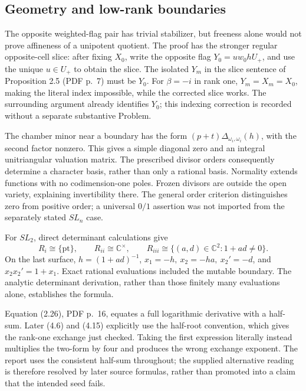 \documentclass[10pt]{article}
\begin{document}
\subsection*{Geometry and low-rank boundaries}
The opposite weighted-flag pair has trivial stabilizer, but freeness alone would not prove affineness of a unipotent quotient. The proof has the stronger regular opposite-cell slice: after fixing \(X_0\), write the opposite flag \(Y_0=u w_0hU_+\), and use the unique \(u\in U_+\) to obtain the slice. The isolated \(Y_m\) in the slice sentence of Proposition 2.5 (PDF p. 7) must be \(Y_0\). For \(\beta=-i\) in rank one, \(Y_m=X_m=X_0\), making the literal index impossible, while the corrected slice works. The surrounding argument already identifies \(Y_0\); this indexing correction is recorded without a separate substantive Problem.\par
The chamber minor near a boundary has the form \((p+t)\Delta_{\omega_i,\omega_i}(h)\), with the second factor nonzero. This gives a simple diagonal zero and an integral unitriangular valuation matrix. The prescribed divisor orders consequently determine a character basis, rather than only a rational basis. Normality extends functions with no codimension-one poles. Frozen divisors are outside the open variety, explaining invertibility there. The general order criterion distinguishes zero from positive order; a universal \(0/1\) assertion was not imported from the separately stated \(SL_n\) case.\par
For \(SL_2\), direct determinant calculations give \[R_i\cong\{\mathrm{pt}\},\qquad R_{ii}\cong\mathbb C^\times,\qquad
 R_{iii}\cong\{(a,d)\in\mathbb C^2:1+ad\ne0\}.\] On the last surface, \(h=(1+ad)^{-1}\), \(x_1=-h,\ x_2=-ha,\ x_2'=-d\), and \(x_2x_2'=1+x_1\). Exact rational evaluations included the mutable boundary. The analytic determinant derivation, rather than those finitely many evaluations alone, establishes the formula.\par
Equation (2.26), PDF p. 16, equates a full logarithmic derivative with a half-sum. Later (4.6) and (4.15) explicitly use the half-root convention, which gives the rank-one exchange just checked. Taking the first expression literally instead multiplies the two-form by four and produces the wrong exchange exponent. The report uses the consistent half-sum throughout; the supplied alternative reading is therefore resolved by later source formulas, rather than promoted into a claim that the intended seed fails.\par
\end{document}
